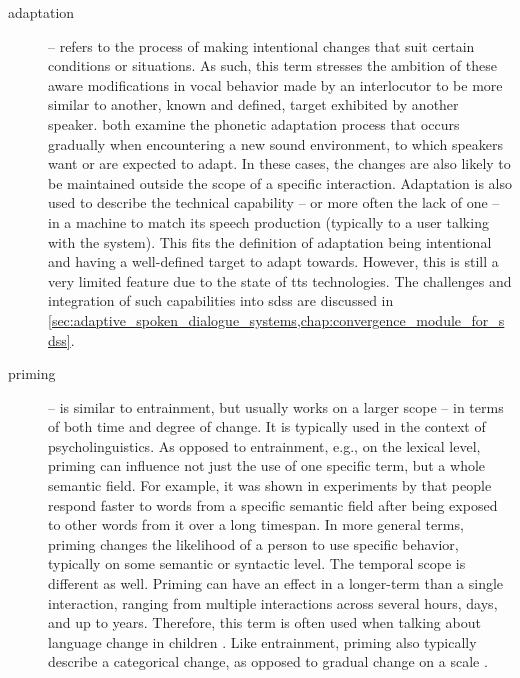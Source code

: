 \begin{description}
	\item[adaptation] -- refers to the process of making intentional changes that suit certain conditions or situations.
	As such, this term stresses the ambition of these aware modifications in vocal behavior made by an interlocutor to be more similar to another, known and defined, target exhibited by another speaker.
	\citet{Kang2010emergence, Hwang2015phonetic} both examine the phonetic adaptation process that occurs gradually when encountering a new sound environment, to which speakers want or are expected to adapt.
	In these cases, the changes are also likely to be maintained outside the scope of a specific interaction.
	Adaptation is also used to describe the technical capability -- or more often the lack of one -- in a machine to match its speech production (typically to a user talking with the system).
	This fits the definition of adaptation being intentional and having a well-defined target to adapt towards.
	However, this is still a very limited feature due to the state of \ac{tts} technologies.
	The challenges and integration of such capabilities into \acp{sds} are discussed in \cref{sec:adaptive_spoken_dialogue_systems,chap:convergence_module_for_sdss}.
	
	\item[priming] -- is similar to entrainment, but usually works on a larger scope -- in terms of both time and degree of change.
	It is typically used in the context of psycholinguistics.
	As opposed to entrainment, e.g., on the lexical level, priming can influence not just the use of one specific term, but a whole semantic field.
	For example, it was shown in experiments by \citet{Meyer1971facilitation, Schvaneveldt1973retrieval} that people respond faster to words from a specific semantic field after being exposed to other words from it over a long timespan.
	In more general terms, priming changes the likelihood of a person to use specific behavior, typically on some semantic or syntactic level.
	The temporal scope is different as well.
	Priming can have an effect in a longer-term than a single interaction, ranging from multiple interactions across several hours, days, and up to years.
	Therefore, this term is often used when talking about language change in children \citep[see, e.g., ][]{Huttenlocher2004syntactic, Wansink2012would}.
	Like entrainment, priming also typically describe a categorical change, as opposed to gradual change on a scale \citep[see \textit{entrainment} and cf.][]{Reitter2006computational, Pace2013concept}.
	

\end{description}
